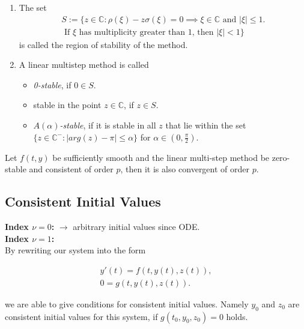 	\begin{frame}
		\vfill
			\begin{definition}
			\begin{enumerate}
				\item 
				The set
				\begin{equation}
					\begin{aligned}
						S := \{z \in \mathbb{C} : \rho(\xi) - z \sigma(\xi) = 0 \implies \xi \in \mathbb{C} \text{ and } |\xi| \leq 1. \\
						\text{ If $\xi$ has multiplicity greater than $1$, then } |\xi| < 1\}
					\end{aligned}
				\end{equation}
				is called the region of stability of the method.
				\item 
				A linear multistep method is called
				\begin{itemize}
					\item \emph{0-stable}, if $0 \in S$.
					\item stable in the point $z \in \mathbb{C}$, if $z \in S$.
					\item \emph{$A(\alpha)$-stable}, if it is stable in all $z$ that lie within the set $\{z \in \mathbb{C}^- : |arg(z)-\pi| \leq \alpha\}$ for $\alpha \in (0, \frac{\pi}{2})$.		 
				\end{itemize}
			\end{enumerate}
		\end{definition}
		\vfill
	\end{frame}
	
	\begin{frame}
		\vfill
		\begin{theorem}%
			\label{th: null-stbaility and consistence is convergence}
			Let $f(t,y)$ be sufficiently smooth and the linear multi-step method be zero-stable and consistent of order $p$, then it is also convergent of order $p$.
		\end{theorem}
		\vfill
	\end{frame}
	
	\subsection{Consistent Initial Values}
	\begin{frame}
		\vfill
		\textbf{Index $\nu = 0$:} $\to$ arbitrary initial values since ODE.\\ 
		
		\textbf{Index $\nu = 1$:}\\
		
		By rewriting our system into the form
		
		\begin{align*}
			y'(t) = f(t,y(t),z(t)), \\
			0 = g(t,y(t),z(t)).
		\end{align*}
		
		we are able to give conditions for consistent initial values. Namely $y_0$ and $z_0$ are consistent initial values for this system, if $g(t_0, y_0, z_0) = 0$ holds.
		\vfill
	\end{frame}
	
